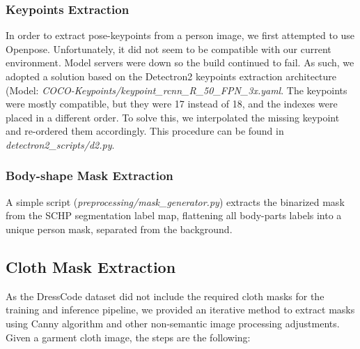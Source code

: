 \subsubsection{Keypoints Extraction}

In order to extract pose-keypoints from a person image, we first attempted to use Openpose. Unfortunately, it did not seem to be compatible with our current environment. Model servers were down so the build continued to fail. As such, we adopted a solution based on the Detectron2 \cite{detectron2} keypoints extraction architecture (Model: \textit{COCO-Keypoints/keypoint\_rcnn\_R\_50\_FPN\_3x.yaml}. The keypoints were mostly compatible, but they were 17 instead of 18, and the indexes were placed in a different order. To solve this, we interpolated the missing keypoint and re-ordered them accordingly. This procedure can be found in \textit{detectron2\_scripts/d2.py}.


\subsubsection{Body-shape Mask Extraction}
 A simple script (\textit{preprocessing/mask\_generator.py}) extracts the binarized mask from the SCHP segmentation label map, flattening all body-parts labels into a unique person mask, separated from the background. 


\subsection{Cloth Mask Extraction}
As the DressCode dataset did not include the required cloth masks for the training and inference pipeline, we provided an iterative method to extract masks using Canny algorithm and other non-semantic image processing adjustments. Given a garment cloth image, the steps are the following:

